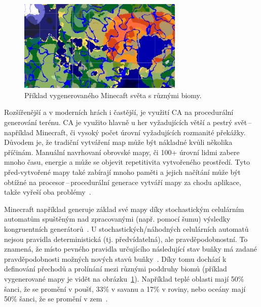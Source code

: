 \begin{figure}[H]
    \centering
    \includegraphics[width=0.7\textwidth]{obrazky-figures/ch2/minecraft_biom.png}
    \caption{Příklad vygenerovaného Minecaft světa s různými biomy.}
    \label{fig:minecraft_biom}
\end{figure}

Rozšířenější a v moderních hrách i častější, je využití CA na procedurální generování terénu. CA je využito hlavně u her vyžadujících větší a pestrý svět\,--\,například Minecraft, či vysoký počet úrovní vyžadujících rozmanité překážky. Důvodem je, že tradiční  vytváření map může být nákladné kvůli několika příčinám. Manuální navrhovaní obrovské mapy, či 100+ úrovní lidmi zabere mnoho času, energie a může se objevit repetitivita vytvořeného prostředí. Tyto před-vytvořené mapy také zabírají mnoho paměti a jejich načítání může být obtížné na procesor\,--\,procedurální generace vytváří mapy za chodu aplikace, takže vyřeší oba problémy~\cite{Procedural_Game_Map}.

Minecraft například generuje základ své mapy díky stochastickým celulárním automatům spuštěným nad zpracovanými (např. pomocí šumu) výsledky kongruentních generátorů~\cite{Minecraft}. U stochastických/náhodných celulárních automatů nejsou pravidla deterministická (tj. předvídatelná), ale pravděpodobnostní. To znamená, že místo pevného pravidla určujícího následující stav buňky má zadané pravděpodobnosti možných nových stavů buňky~\cite{DBLP:journals/corr/abs-1304-7185}. Díky tomu dochází k definování přechodů a prolínání mezi různými poddruhy biomů (příklad vygenerované mapy je vidět na obrázku~\ref{fig:minecraft_biom}). Například teplé oblasti mají 50\% šanci, že se promění v poušť, 33\% v savanu a 17\% v roviny, nebo oceány mají 50\% šanci, že se promění v zem~\cite{Minecraft}.

